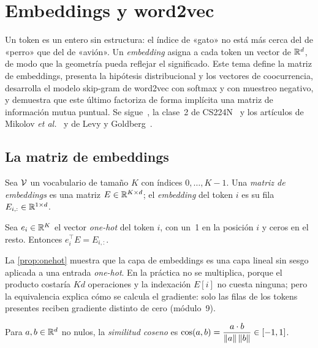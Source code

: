 \chapter{Embeddings y word2vec}
\label{tema:4}

Un token es un entero sin estructura: el índice de «gato» no está más cerca del de «perro» que del de «avión». Un \emph{embedding} asigna a cada token un vector de $\mathbb{R}^{d}$, de modo que la geometría pueda reflejar el significado. Este tema define la matriz de embeddings, presenta la hipótesis distribucional y los vectores de coocurrencia, desarrolla el modelo skip-gram de word2vec con softmax y con muestreo negativo, y demuestra que este último factoriza de forma implícita una matriz de información mutua puntual. Se sigue~\cite[§5.2--5.5]{jm3}, la clase~2 de CS224N~\cite{cs224n} y los artículos de Mikolov \emph{et al.}~\cite{mikolov13a,mikolov13b} y de Levy y Goldberg~\cite{levy}.

\section{La matriz de embeddings}

\begin{definicion}\label{def:embedding}
Sea $\mathcal{V}$ un vocabulario de tamaño $K$ con índices $0,\dots,K-1$. Una \emph{matriz de embeddings} es una matriz $E\in\mathbb{R}^{K\times d}$; el \emph{embedding} del token $i$ es su fila $E_{i,:}\in\mathbb{R}^{1\times d}$.
\end{definicion}

\begin{proposicion}\label{prop:onehot}
Sea $e_i\in\mathbb{R}^{K}$ el vector \emph{one-hot} del token $i$, con un~1 en la posición $i$ y ceros en el resto. Entonces $e_i^{\top}E=E_{i,:}$.
\end{proposicion}

La \cref{prop:onehot} muestra que la capa de embeddings es una capa lineal sin sesgo aplicada a una entrada \emph{one-hot}. En la práctica no se multiplica, porque el producto costaría $Kd$ operaciones y la indexación $E[i]$ no cuesta ninguna; pero la equivalencia explica cómo se calcula el gradiente: solo las filas de los tokens presentes reciben gradiente distinto de cero (módulo~9).

\begin{definicion}
Para $a,b\in\mathbb{R}^{d}$ no nulos, la \emph{similitud coseno} es $\cos(a,b)=\dfrac{a\cdot b}{\lVert a\rVert\,\lVert b\rVert}\in[-1,1]$.
\end{definicion}

